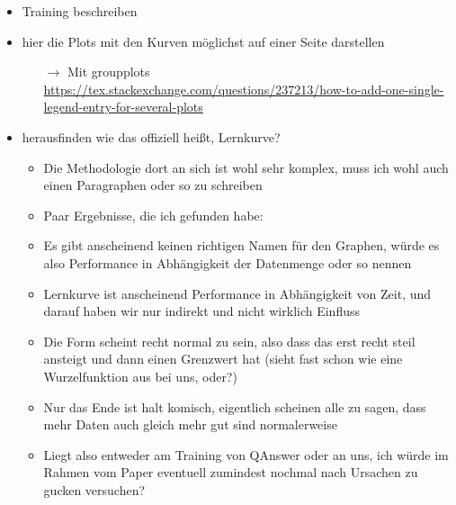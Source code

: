 \documentclass[utf8,biblatex]{lni}
\begin{document}
\begin{itemize}
  \item Training beschreiben
  \item hier die Plots mit den Kurven möglichst auf einer Seite darstellen
  \begin{itemize}
    \item[$\rightarrow$] Mit groupplots \url{https://tex.stackexchange.com/questions/237213/how-to-add-one-single-legend-entry-for-several-plots}
  \end{itemize}
  \item herausfinden wie das offiziell heißt, Lernkurve?
  \begin{itemize}
    \item Die Methodologie dort an sich ist wohl sehr komplex, muss ich wohl auch einen Paragraphen oder so zu schreiben
    \item Paar Ergebnisse, die ich gefunden habe:
    \item Es gibt anscheinend keinen richtigen Namen für den Graphen, würde es also Performance in Abhängigkeit der Datenmenge oder so nennen
    \item Lernkurve ist anscheinend Performance in Abhängigkeit von Zeit, und darauf haben wir nur indirekt und nicht wirklich Einfluss
    \item Die Form scheint recht normal zu sein, also dass das erst recht steil ansteigt und dann einen Grenzwert hat (sieht fast schon wie eine Wurzelfunktion aus bei uns, oder?)
    \item Nur das Ende ist halt komisch, eigentlich scheinen alle zu sagen, dass mehr Daten auch gleich mehr gut sind normalerweise
    \item Liegt also entweder am Training von QAnswer oder an uns, ich würde im Rahmen vom Paper eventuell zumindest nochmal nach Ursachen zu gucken versuchen?
  \end{itemize}
\end{itemize}
\end{document}
